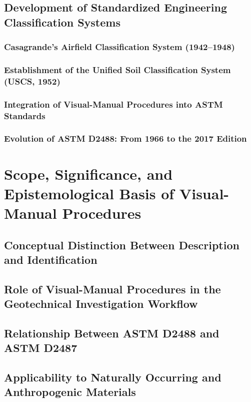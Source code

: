 \subsection{Development of Standardized Engineering Classification Systems}

\subsubsection{Casagrande's Airfield Classification System (1942--1948)}

\subsubsection{Establishment of the Unified Soil Classification System (USCS, 1952)}

\subsubsection{Integration of Visual-Manual Procedures into ASTM Standards}

\subsubsection{Evolution of ASTM D2488: From 1966 to the 2017 Edition}

\section{Scope, Significance, and Epistemological Basis of Visual-Manual Procedures}

\subsection{Conceptual Distinction Between Description and Identification}

\subsection{Role of Visual-Manual Procedures in the Geotechnical Investigation Workflow}

\subsection{Relationship Between ASTM D2488 and ASTM D2487}

\subsection{Applicability to Naturally Occurring and Anthropogenic Materials}


